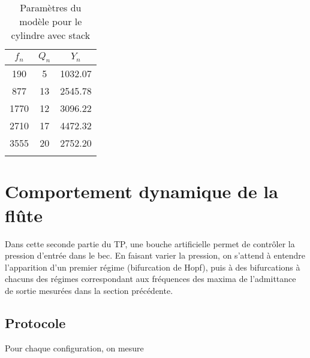 \documentclass[atiam, article]{rapport} %
\begin{document}
\begin{table}[H]
    \centering
    \begin{tabular}{ccc}
\toprule
$f_n$ & $Q_n$ & $Y_n$ \\ \midrule
190 & 5 & 1032.07 \\
877 & 13 & 2545.78 \\
1770 & 12 & 3096.22 \\
2710 & 17 & 4472.32 \\
3555 & 20 & 2752.20 \\
\bottomrule\\
    \end{tabular}
    \caption{Paramètres du modèle pour le cylindre avec stack}
    \label{tab:param_cylindre+stack}
\end{table}

\section{Comportement dynamique de la flûte}

Dans cette seconde partie du TP, une bouche artificielle permet de contrôler la pression d'entrée dans le bec. En faisant varier la pression, on s'attend à entendre l'apparition d'un premier régime (bifurcation de Hopf), puis à des bifurcations à chacuns des régimes correspondant aux fréquences des maxima de l'admittance de sortie mesurées dans la section précédente.

\subsection{Protocole}

Pour chaque configuration, on mesure %

\printbibliography
\end{document}
